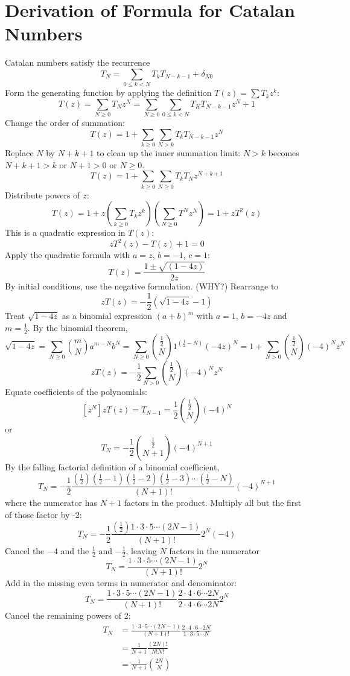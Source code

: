 \documentclass[11pt, oneside]{article}   	%
\begin{document}
\section{Derivation of Formula for Catalan Numbers}
Catalan numbers satisfy the recurrence
\[
	T_N = \sum_{0 \le k < N} T_k T_{N-k-1} + \delta_{N0}
\]
Form the generating function by applying the definition $T(z) = \sum T_k z^k$:
\[
	T(z) = \sum_{N \ge 0} T_N z^N = \sum_{N \ge 0} \sum_{0 \le k < N} T_K T_{N-k-1} z^N + 1
\]
Change the order of summation:
\[
	T(z) = 1 + \sum_{k \ge 0} \sum_{N>k} T_k T_{N-k-1} z^N
\]
Replace $N$ by $N+k+1$ to clean up the inner summation limit: $N>k$ becomes $N+k+1 > k$ or $N+1>0$ or $N \ge 0$.
\[
	T(z) = 1 + \sum_{k \ge 0} \sum_{N \ge 0} T_k T_N z^{N+k+1}
\]
Distribute powers of $z$:
\[
	T(z) = 1 + z \left(\sum_{k \ge 0} T_k z^k\right) \left( \sum_{N \ge 0} T^N z^N \right) = 1 + z T^2(z)
\]
This is a quadratic expression in $T(z)$:
\[
	zT^2(z) - T(z) + 1 = 0
\]
Apply the quadratic formula with $a=z$, $b=-1$, $c=1$:
\[
	T(z) = \frac{1 \pm \sqrt{(1-4z)}}{2z}
\]
By initial conditions, use the negative formulation. (WHY?) Rearrange to
\[
	zT(z) = -\frac{1}{2}\left(\sqrt{1-4z} -1\right)
\]
Treat $\sqrt{1-4z}$ as a binomial expression $(a+b)^m$ with $a=1$, $b=-4z$ and $m=\frac{1}{2}$. By the binomial theorem,
\[
	\sqrt{1-4z} =  \sum_{N\ge0} \binom{m}{N} a^{m-N} b^N =  \sum_{N\ge0} \binom{\frac{1}{2}}{N} 1^{(\frac{1}{2}-N)} (-4z)^N = 1+ \sum_{N>0} \binom{\frac{1}{2}}{N} (-4)^N z^N
\]
\[
	zT(z) = -\frac{1}{2}\sum_{N>0} \binom{\frac{1}{2}}{N} (-4)^N z^N
\]
Equate coefficients of the polynomials:
\[
	\left[ z^N \right] zT(z) = T_{N-1} = \frac{1}{2} \binom{\frac{1}{2}}{N} (-4)^N
\]
or
\[
	T_N = -\frac{1}{2} \binom{\frac{1}{2}}{N+1} (-4)^{N+1}
\]
By the falling factorial definition of a binomial coefficient,
\[
	T_N = -\frac{1}{2} \frac{(\frac{1}{2})(\frac{1}{2}-1)(\frac{1}{2}-2)(\frac{1}{2}-3)\cdots(\frac{1}{2}-N)}{(N+1)!} (-4)^{N+1}
\]
where the numerator has $N+1$ factors in the product.  Multiply all but the first of those factor by -2:
\[
	T_N = -\frac{1}{2} \frac{(\frac{1}{2})1 \cdot 3 \cdot 5 \cdots (2N-1)}{(N+1)!} 2^N (-4)
\]
Cancel the $-4$ and the $\frac{1}{2}$ and $-\frac{1}{2}$, leaving $N$ factors in the numerator
\[
	T_N = \frac{1 \cdot 3 \cdot 5 \cdots (2N-1) }{(N+1)!} 2^N
\]
Add in the missing even terms in numerator and denominator:
\[
	T_N = \frac{1 \cdot 3 \cdot 5 \cdots (2N-1) }{(N+1)!} \frac{2 \cdot 4 \cdot 6 \cdots 2N}{2 \cdot 4 \cdot 6 \cdots 2N} 2^N
\]
Cancel the remaining powers of 2:
\begin{align*}
	T_N &= \frac{1 \cdot 3 \cdot 5 \cdots (2N-1)}{(N+1)!}  \frac{2 \cdot 4 \cdot 6 \cdots 2N}{1 \cdot 3 \cdot 5 \cdots N} \\
		&= \frac{1}{N+1} \frac{(2N)!}{N! N!} \\
		&= \frac{1}{N+1} \binom{2N}{N}
\end{align*}
\end{document}
